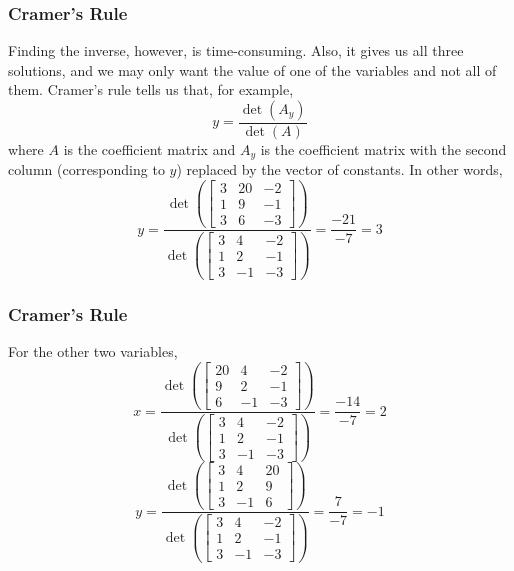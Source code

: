 \documentclass[xcolor=dvipsnames]{beamer}
\begin{document}
\begin{frame}
  \frametitle{Cramer's Rule}
  Finding the inverse, however, is time-consuming. Also, it gives us
  all three solutions, and we may only want the value of one of the
  variables and not all of them. Cramer's rule tells us that, for
  example,
  \begin{equation}
    \label{eq:aquohkol}
    y=\frac{\det(A_{y})}{\det(A)}
  \end{equation}
  where $A$ is the coefficient matrix and $A_{y}$ is the coefficient
  matrix with the second column (corresponding to $y$) replaced by the
  vector of constants. In other words,
\begin{equation}
  \label{eq:veefoubu}
  y=\frac{\det\left(\left[
        \begin{array}{ccc}
          3 & 20 & -2 \\
          1 & 9 & -1 \\
          3 & 6 & -3
        \end{array}
\right]\right)}{\det\left(\left[
      \begin{array}{ccc}
        3 & 4 & -2 \\
        1 & 2 & -1 \\
        3 & -1 & -3
      \end{array}\right]\right)}=\frac{-21}{-7}=3
\end{equation}
\end{frame}

\begin{frame}
  \frametitle{Cramer's Rule}
  For the other two variables,
  \begin{equation}
    \label{eq:sheethei}
    x=\frac{\det\left(\left[
        \begin{array}{ccc}
        20 & 4 & -2 \\
        9 & 2 & -1 \\
        6 & -1 & -3
        \end{array}
\right]\right)}{\det\left(\left[
      \begin{array}{ccc}
        3 & 4 & -2 \\
        1 & 2 & -1 \\
        3 & -1 & -3
      \end{array}\right]\right)}=\frac{-14}{-7}=2
  \end{equation}
  \begin{equation}
    \label{eq:ijohmahv}
    y=\frac{\det\left(\left[
        \begin{array}{ccc}
        3 & 4 & 20 \\
        1 & 2 & 9 \\
        3 & -1 & 6
        \end{array}
\right]\right)}{\det\left(\left[
      \begin{array}{ccc}
        3 & 4 & -2 \\
        1 & 2 & -1 \\
        3 & -1 & -3
      \end{array}\right]\right)}=\frac{7}{-7}=-1
  \end{equation}
\end{frame}
\end{document}
